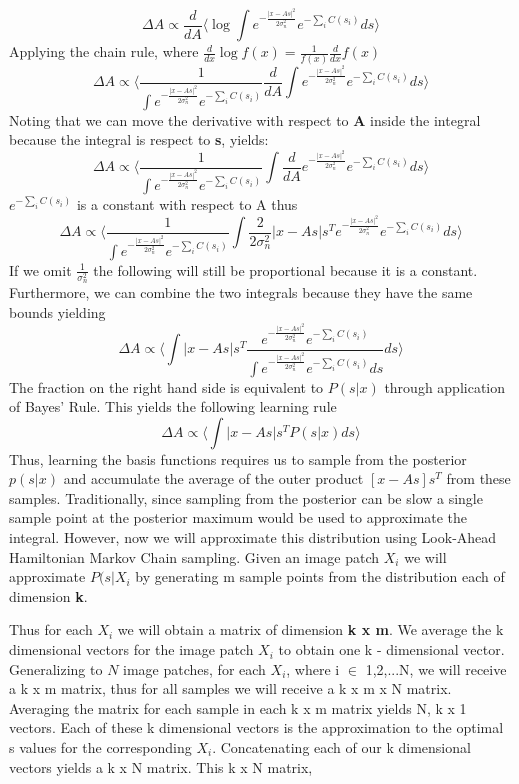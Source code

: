 \documentclass{article}
\begin{document}
\newcommand{\pxss}{e^{-\frac{|x - As|^2}{2\sigma_n^2}}e^{-\sum_i C(s_i)}}

\begin{equation}
    \Delta A \propto \frac{d}{dA} \langle \log\int{\pxss ds} \rangle
\end{equation}
Applying the chain rule, where $\frac{d}{dx}\log f(x) = \frac{1}{f(x)}\frac{d}{dx}f(x)$
\begin{equation}
    \Delta A \propto \langle \frac{1}{\int\pxss}\frac{d}{dA}\int{\pxss ds} \rangle
\end{equation}
Noting that we can move the derivative with respect to \textbf{A} inside the integral because the integral is respect to \textbf{s}, yields:
\begin{equation}
    \Delta A \propto \langle \frac{1}{\int\pxss}\int\frac{d}{dA}\pxss ds \rangle
\end{equation}
$e^{-\sum_i C(s_i)}$ is a constant with respect to A thus
\begin{equation}
    \Delta A \propto \langle\frac{1}{\int\pxss}\int{\frac{2}{2\sigma_n^2}|x - As|s^T\pxss ds}\rangle
\end{equation}
If we omit $\frac{1}{\sigma_n^2}$ the following will still be proportional because it is a constant. Furthermore, we can combine the two integrals because they have the same bounds yielding
\begin{equation}
    \Delta A \propto \langle \int{|x - As|s^T\frac{\pxss}{\int\pxss ds} ds} \rangle
\end{equation}
The fraction on the right hand side is equivalent to $P(s|x)$ through application of Bayes' Rule. This yields the following learning rule
\begin{equation}
    \Delta A \propto \langle \int{|x - As|s^TP(s|x)ds}\rangle
\end{equation}
Thus, learning the basis functions requires us to sample from the posterior {$p(s|x)$} and accumulate the average of the outer product {$[x - As]s^T$} from these samples. Traditionally, since sampling from the posterior can be slow a single sample point at the posterior maximum would be used to approximate the integral. However, now we will approximate this distribution using Look-Ahead Hamiltonian Markov Chain sampling. Given an image patch {$X_i$} we will approximate {$P(s|X_i$} by generating m sample points from the distribution each of dimension \textbf{k}. 
\par Thus for each $X_i$ we will obtain a matrix of dimension \textbf{k x m}. We average the k dimensional vectors for the image patch $X_i$ to obtain one k - dimensional vector. Generalizing to \textbf{$N$} image patches, for each $X_i$, where i $\in$ 1,2,...N, we will receive a k x m matrix, thus for all samples we will receive a k x m x N matrix. Averaging the matrix for each sample in each k x m matrix yields N, k x 1 vectors. Each of these k dimensional vectors is the approximation to the optimal s values for the corresponding $X_i$. Concatenating each of our k dimensional vectors yields a k x N matrix. This k x N matrix,
\end{document}
